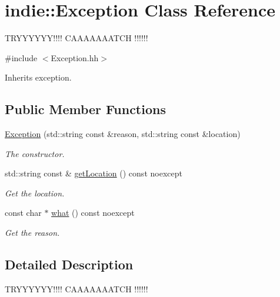 \hypertarget{classindie_1_1Exception}{}\section{indie\+:\+:Exception Class Reference}
\label{classindie_1_1Exception}


T\+R\+Y\+Y\+Y\+Y\+Y\+Y!!!! C\+A\+A\+A\+A\+A\+A\+A\+T\+CH !!!!!!  




{\ttfamily \#include $<$Exception.\+hh$>$}



Inherits exception.

\subsection*{Public Member Functions}
\begin{DoxyCompactItemize}
\item 
\hyperlink{classindie_1_1Exception_a68279adc3c4acbc7f43c76502f8dd19b}{Exception} (std\+::string const \&reason, std\+::string const \&location)
\begin{DoxyCompactList}\small\item\em The constructor. \end{DoxyCompactList}\item 
\mbox{\label{classindie_1_1Exception_a684642d64f57d5dc90e689406d8978a3}} 
std\+::string const  \& \hyperlink{classindie_1_1Exception_a684642d64f57d5dc90e689406d8978a3}{get\+Location} () const noexcept
\begin{DoxyCompactList}\small\item\em Get the location. \end{DoxyCompactList}\item 
\mbox{\label{classindie_1_1Exception_a9a0afec84fa217fb666a7495763e2779}} 
const char $\ast$ \hyperlink{classindie_1_1Exception_a9a0afec84fa217fb666a7495763e2779}{what} () const noexcept
\begin{DoxyCompactList}\small\item\em Get the reason. \end{DoxyCompactList}\end{DoxyCompactItemize}


\subsection{Detailed Description}
T\+R\+Y\+Y\+Y\+Y\+Y\+Y!!!! C\+A\+A\+A\+A\+A\+A\+A\+T\+CH !!!!!! 

